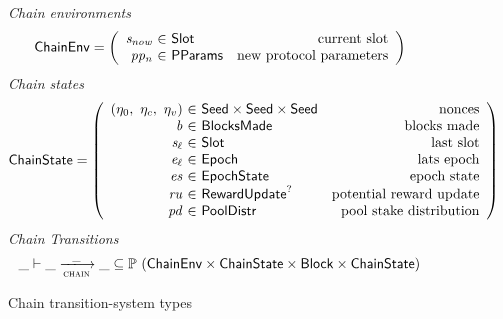 \begin{figure}
  \emph{Chain environments}
  \begin{equation*}
    \ChainEnv =
    \left(
      \begin{array}{r@{~\in~}lr}
        \var{s_{now}} & \Slot & \text{current slot} \\
        \var{pp_n} & \PParams & \text{new protocol parameters} \\
      \end{array}
    \right)
  \end{equation*}
  \emph{Chain states}
  \begin{equation*}
    \ChainState =
    \left(
      \begin{array}{r@{~\in~}lr}
        (\eta_0,~\eta_c,~\eta_v) & \Seed\times\Seed\times\Seed & \text{nonces} \\
        \var{b} & \BlocksMade & \text{blocks made} \\
        \var{s_\ell} & \Slot & \text{last slot} \\
        \var{e_\ell} & \Epoch & \text{lats epoch} \\
        \var{es} & \EpochState & \text{epoch state} \\
        \var{ru} & \RewardUpdate^? & \text{potential reward update} \\
        \var{pd} & \PoolDistr & \text{pool stake distribution} \\
      \end{array}
    \right)
  \end{equation*}
  \emph{Chain Transitions}
  \begin{equation*}
    \_ \vdash \var{\_} \trans{chain}{\_} \var{\_} \subseteq
    \powerset (\ChainEnv \times \ChainState \times \Block \times \ChainState)
  \end{equation*}
  \caption{Chain transition-system types}
  \label{fig:ts-types:chain}
\end{figure}

